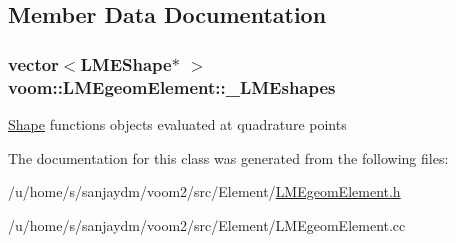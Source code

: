 \subsection{Member Data Documentation}
\hypertarget{classvoom_1_1_l_m_egeom_element_a76909b4c2030b797f17106f5bc5e3b11}{
\subsubsection[{\_\-LMEshapes}]{\setlength{\rightskip}{0pt plus 5cm}vector$<${\bf LMEShape}$\ast$ $>$ {\bf voom::LMEgeomElement::\_\-LMEshapes}}}
\label{classvoom_1_1_l_m_egeom_element_a76909b4c2030b797f17106f5bc5e3b11}
\hyperlink{classvoom_1_1_shape}{Shape} functions objects evaluated at quadrature points 

The documentation for this class was generated from the following files:\begin{DoxyCompactItemize}
\item 
/u/home/s/sanjaydm/voom2/src/Element/\hyperlink{_l_m_egeom_element_8h}{LMEgeomElement.h}\item 
/u/home/s/sanjaydm/voom2/src/Element/LMEgeomElement.cc\end{DoxyCompactItemize}
